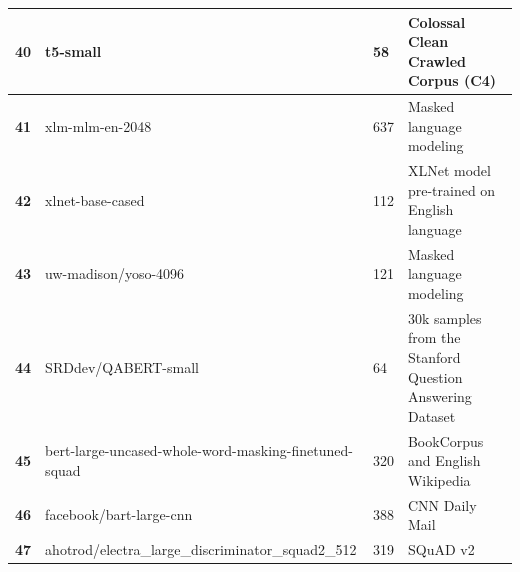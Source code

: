 \documentclass[11pt]{article}
\begin{document}
\begin{table}[htbp]
{\begin{tabular}{|l|l|l|l|}
\textbf{40} & t5-small  & 58 & Colossal Clean Crawled Corpus (C4) \\ \hline
\textbf{41} & xlm-mlm-en-2048  & 637 & Masked language modeling \\ \hline
\textbf{42} & xlnet-base-cased  & 112 & XLNet model pre-trained on English language \\ \hline
\textbf{43} & uw-madison/yoso-4096 & 121 & Masked language modeling \\ \hline
\textbf{44} & SRDdev/QABERT-small  & 64 & 30k samples from the Stanford Question Answering Dataset \\ \hline
\textbf{45} & bert-large-uncased-whole-word-masking-finetuned-squad    & 320 & BookCorpus and English Wikipedia \\ \hline
\textbf{46} & facebook/bart-large-cnn  & 388 & CNN Daily Mail \\ \hline
\textbf{47} & ahotrod/electra\_large\_discriminator\_squad2\_512 & 319 & SQuAD v2 \\ \hline
\end{tabular}
}
\end{table}
\end{document}
